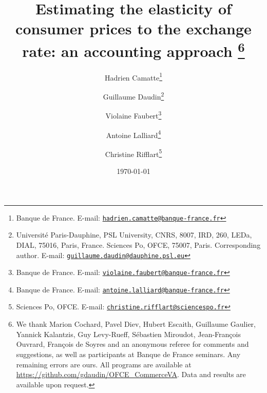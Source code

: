 \documentclass[11pt,a4paper]{paper} %
\newcommand{\email}[1]{\href{mailto:#1}{\nolinkurl{#1}}}
\begin{document}
\title{Estimating the elasticity of consumer prices to the exchange rate: an accounting approach	\thanks{We thank Marion Cochard, Pavel Diev, Hubert Escaith, Guillaume Gaulier, Yannick Kalantzis, Guy Levy-Rueff, Sébastien Miroudot, Jean-François Ouvrard, François de Soyres and an anonymous referee for comments and suggestions, as well as participants at Banque de France seminars. Any remaining errors are ours. All programs are available at \url{https://github.com/gdaudin/OFCE_CommerceVA}. Data and results are available upon request.}\\
\vspace{1cm}
}
\vspace{1cm}
\date{\today}
\author{
	Hadrien Camatte\thanks{Banque de France. E-mail: \email{hadrien.camatte@banque-france.fr}}
	\and
	Guillaume Daudin\thanks{Université Paris-Dauphine, PSL University, CNRS, 8007, IRD, 260, LEDa, DIAL, 75016, Paris, France. Sciences Po, OFCE, 75007, Paris. Corresponding author. E-mail: \email{guillaume.daudin@dauphine.psl.eu}}
	\and
	Violaine Faubert\thanks{Banque de France. E-mail: \email{violaine.faubert@banque-france.fr}}
	\and
	Antoine Lalliard\thanks{Banque de France. E-mail: \email{antoine.lalliard@banque-france.fr}}
	\and
	Christine Rifflart\thanks{Sciences Po, OFCE. E-mail: \email{christine.rifflart@sciencespo.fr}}
}
\maketitle

\end{document}
